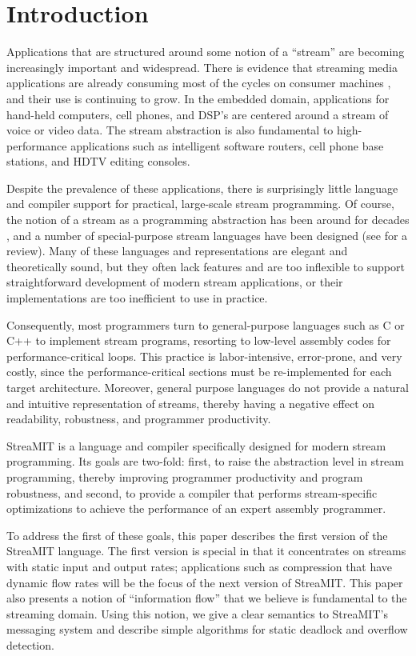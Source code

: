\section{Introduction}

Applications that are structured around some notion of a ``stream''
are becoming increasingly important and widespread.  There is evidence
that streaming media applications are already consuming most of the
cycles on consumer machines \cite{Rix98}, and their use is continuing
to grow.  In the embedded domain, applications for hand-held
computers, cell phones, and DSP's are centered around a stream of
voice or video data.  The stream abstraction is also fundamental to
high-performance applications such as intelligent software routers,
cell phone base stations, and HDTV editing consoles.

Despite the prevalence of these applications, there is surprisingly
little language and compiler support for practical, large-scale stream
programming.  Of course, the notion of a stream as a programming
abstraction has been around for decades \cite{SICP}, and a number of
special-purpose stream languages have been designed (see
\cite{survey97} for a review).  Many of these languages and
representations are elegant and theoretically sound, but they often
lack features and are too inflexible to support straightforward
development of modern stream applications, or their implementations
are too inefficient to use in practice.

Consequently, most programmers turn to general-purpose languages such
as C or C++ to implement stream programs, resorting to low-level
assembly codes for performance-critical loops.  This practice is
labor-intensive, error-prone, and very costly, since the
performance-critical sections must be re-implemented for each target
architecture.  Moreover, general purpose languages do not provide a
natural and intuitive representation of streams, thereby having a
negative effect on readability, robustness, and programmer
productivity.

StreaMIT is a language and compiler specifically designed for modern
stream programming.  Its goals are two-fold: first, to raise the
abstraction level in stream programming, thereby improving programmer
productivity and program robustness, and second, to provide a compiler
that performs stream-specific optimizations to achieve the performance
of an expert assembly programmer.  

To address the first of these goals, this paper describes the first
version of the StreaMIT language.  The first version is special in
that it concentrates on streams with static input and output rates;
applications such as compression that have dynamic flow rates will be
the focus of the next version of StreaMIT.  This paper also presents a
notion of ``information flow'' that we believe is fundamental to the
streaming domain.  Using this notion, we give a clear semantics to
StreaMIT's messaging system and describe simple algorithms for static
deadlock and overflow detection.

